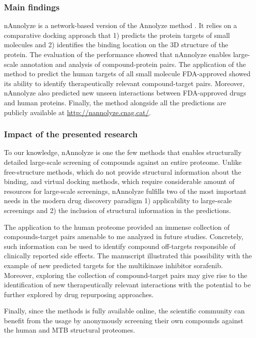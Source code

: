 \documentclass[11pt, b5paper,twoside]{tesi_upf}
\begin{document}
 \subsubsection{Main findings}
 \par nAnnolyze is a network-based version of the Annolyze method \cite{Marti-Renom2007}. It relies on a comparative docking approach that 1) predicts the protein targets of small molecules and 2) identifies the binding location on the 3D structure of the protein. The evaluation of the performance showed that nAnnolyze enables large-scale annotation and analysis of compound-protein pairs. The application of the method to predict the human targets of all small molecule FDA-approved showed its ability to identify therapeutically relevant compound-target pairs. Moreover, nAnnolyze also predicted new unseen interactions between FDA-approved drugs and human proteins. Finally, the method alongside all the predictions are publicly available at \url{http://nannolyze.cnag.cat/}.
 \subsubsection{Impact of the presented research} 
 
 \par To our knowledge, nAnnolyze is one the few methods that enables structurally detailed large-scale screening of compounds against an entire proteome. Unlike free-structure methods, which do not provide structural information about the binding, and virtual docking methods, which require considerable amount of resources for large-scale screenings, nAnnolyze fulfills two of the most important needs in the modern drug discovery paradigm 1) applicability to large-scale screenings and 2) the inclusion of structural information in the predictions. 
 \par The application to the human proteome provided an immense collection of compounds-target pairs amenable to me analyzed in future studies. Concretely, such information can be used to identify compound off-targets responsible of clinically reported side effects. The manuscript illustrated this possibility with the example of new predicted targets for the multikinase inhibitor sorafenib. Moreover, exploring the collection of compound-target pairs may give rise to the identification of new therapeutically relevant interactions with the potential to be further explored by drug repurposing approaches.  
 \par Finally, since the methods is fully available online, the scientific community can benefit from the usage by anonymously screening their own compounds against the human and MTB structural proteomes.
    
\end{document}

